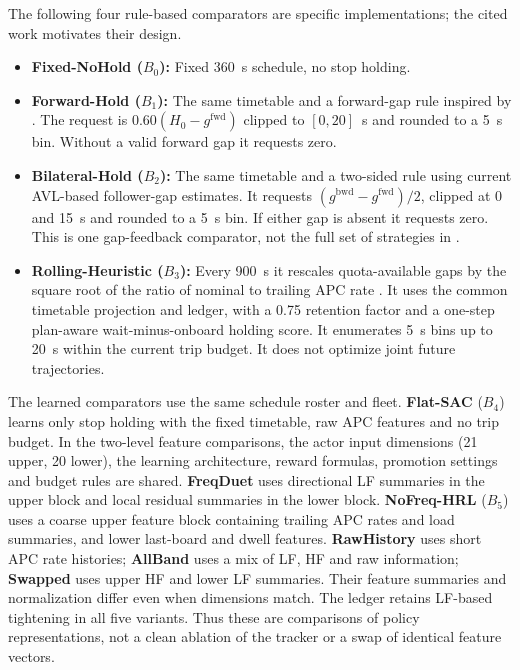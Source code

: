 The following four rule-based comparators are specific implementations; the cited work motivates their design.
\begin{itemize}
  \item \textbf{Fixed-NoHold ($B_0$):} Fixed 360~s schedule, no stop holding.
  \item \textbf{Forward-Hold ($B_1$):} The same timetable and a forward-gap rule inspired by \citet{daganzo2009headway}. The request is $0.60(H_0-g^{\mathrm{fwd}})$ clipped to $[0,20]$~s and rounded to a 5~s bin. Without a valid forward gap it requests zero.
  \item \textbf{Bilateral-Hold ($B_2$):} The same timetable and a two-sided rule using current AVL-based follower-gap estimates. It requests $(g^{\mathrm{bwd}}-g^{\mathrm{fwd}})/2$, clipped at 0 and 15~s and rounded to a 5~s bin. If either gap is absent it requests zero. This is one gap-feedback comparator, not the full set of strategies in \citet{berrebi2018comparing}.
  \item \textbf{Rolling-Heuristic ($B_3$):} Every 900~s it rescales quota-available gaps by the square root of the ratio of nominal to trailing APC rate \citep{newell1971dispatching}. It uses the common timetable projection and ledger, with a 0.75 retention factor and a one-step plan-aware wait-minus-onboard holding score. It enumerates 5~s bins up to 20~s within the current trip budget. It does not optimize joint future trajectories.
\end{itemize}

The learned comparators use the same schedule roster and fleet. \textbf{Flat-SAC} ($B_4$) learns only stop holding with the fixed timetable, raw APC features and no trip budget. In the two-level feature comparisons, the actor input dimensions (21 upper, 20 lower), the learning architecture, reward formulas, promotion settings and budget rules are shared. \textbf{FreqDuet} uses directional LF summaries in the upper block and local residual summaries in the lower block. \textbf{NoFreq-HRL} ($B_5$) uses a coarse upper feature block containing trailing APC rates and load summaries, and lower last-board and dwell features. \textbf{RawHistory} uses short APC rate histories; \textbf{AllBand} uses a mix of LF, HF and raw information; \textbf{Swapped} uses upper HF and lower LF summaries. Their feature summaries and normalization differ even when dimensions match. The ledger retains LF-based tightening in all five variants. Thus these are comparisons of policy representations, not a clean ablation of the tracker or a swap of identical feature vectors.

